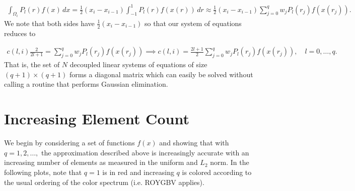 \documentclass{article}
\begin{document}
  \begin{align*}
    \int_{\Omega_i} P_l(r) f(x) \, dx = \frac{1}{2} \left( x_i - x_{i-1}\right) \int_{-1}^1 P_l(r) f(x(r)) \, dr \approx \frac{1}{2} \left( x_i - x_{i-1}\right)\sum_{j=0}^q w_j P_l(r_j) f(x(r_j)).
  \end{align*}
We note that both sides have $\frac{1}{2} \left( x_i - x_{i-1}\right)$ so that our system of equations reduces to 

  \begin{align*}
    c(l,i) \frac{2}{2l + 1} = \sum_{j=0}^q w_j P_l(r_j) f(x(r_j)) \implies c(l,i) = \frac{2l + 1}{2} \sum_{j=0}^q w_j P_l(r_j) f(x(r_j)), \quad l = 0,\dots, q .
  \end{align*}
That is, the set of $N$ decoupled linear systems of equations of size $(q+1)\times(q+1)$ forms a diagonal matrix which can easily be solved without calling a routine that performs Gaussian elimination.

\section{Increasing Element Count}
We begin by considering a set of functions $f(x)$ and showing that with $q=1,2,\dots,$ the approximation described above is increasingly accurate with an increasing number of elements as measured in the uniform and $L_2$ norm. In the following plots, note that $q = 1$ is in red and increasing $q$ is colored according to the usual ordering of the color spectrum (i.e. ROYGBV applies).
\end{document}
